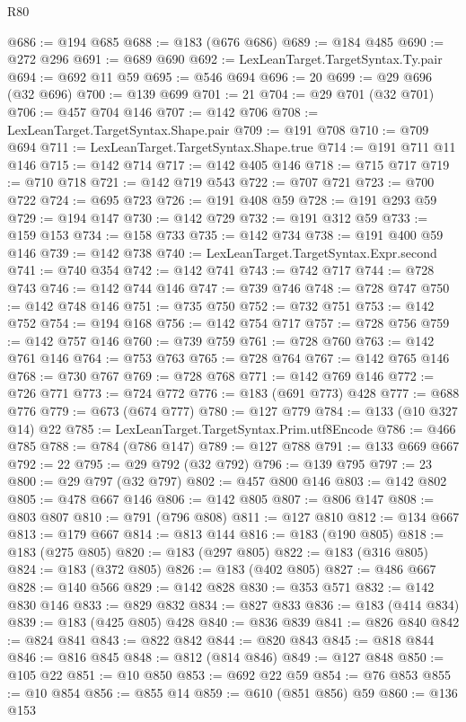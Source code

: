 \begin{lexlean}{R80}
\begin{coremodule}
@686 := @194 @685
@688 := @183 (@676 @686)
@689 := @184 @485
@690 := @272 @296
@691 := @689 @690
@692 := LexLeanTarget.TargetSyntax.Ty.pair
@694 := @692 @11 @59
@695 := @546 @694
@696 := 20
@699 := @29 @696 (@32 @696)
@700 := @139 @699
@701 := 21
@704 := @29 @701 (@32 @701)
@706 := @457 @704 @146
@707 := @142 @706
@708 := LexLeanTarget.TargetSyntax.Shape.pair
@709 := @191 @708
@710 := @709 @694
@711 := LexLeanTarget.TargetSyntax.Shape.true
@714 := @191 @711 @11 @146
@715 := @142 @714
@717 := @142 @405 @146
@718 := @715 @717
@719 := @710 @718
@721 := @142 @719 @543
@722 := @707 @721
@723 := @700 @722
@724 := @695 @723
@726 := @191 @408 @59
@728 := @191 @293 @59
@729 := @194 @147
@730 := @142 @729
@732 := @191 @312 @59
@733 := @159 @153
@734 := @158 @733
@735 := @142 @734
@738 := @191 @400 @59 @146
@739 := @142 @738
@740 := LexLeanTarget.TargetSyntax.Expr.second
@741 := @740 @354
@742 := @142 @741
@743 := @742 @717
@744 := @728 @743
@746 := @142 @744 @146
@747 := @739 @746
@748 := @728 @747
@750 := @142 @748 @146
@751 := @735 @750
@752 := @732 @751
@753 := @142 @752
@754 := @194 @168
@756 := @142 @754 @717
@757 := @728 @756
@759 := @142 @757 @146
@760 := @739 @759
@761 := @728 @760
@763 := @142 @761 @146
@764 := @753 @763
@765 := @728 @764
@767 := @142 @765 @146
@768 := @730 @767
@769 := @728 @768
@771 := @142 @769 @146
@772 := @726 @771
@773 := @724 @772
@776 := @183 (@691 @773) @428
@777 := @688 @776
@779 := @673 (@674 @777)
@780 := @127 @779
@784 := @133 (@10 @327 @14) @22
@785 := LexLeanTarget.TargetSyntax.Prim.utf8Encode
@786 := @466 @785
@788 := @784 (@786 @147)
@789 := @127 @788
@791 := @133 @669 @667
@792 := 22
@795 := @29 @792 (@32 @792)
@796 := @139 @795
@797 := 23
@800 := @29 @797 (@32 @797)
@802 := @457 @800 @146
@803 := @142 @802
@805 := @478 @667 @146
@806 := @142 @805
@807 := @806 @147
@808 := @803 @807
@810 := @791 (@796 @808)
@811 := @127 @810
@812 := @134 @667
@813 := @179 @667
@814 := @813 @144
@816 := @183 (@190 @805)
@818 := @183 (@275 @805)
@820 := @183 (@297 @805)
@822 := @183 (@316 @805)
@824 := @183 (@372 @805)
@826 := @183 (@402 @805)
@827 := @486 @667
@828 := @140 @566
@829 := @142 @828
@830 := @353 @571
@832 := @142 @830 @146
@833 := @829 @832
@834 := @827 @833
@836 := @183 (@414 @834)
@839 := @183 (@425 @805) @428
@840 := @836 @839
@841 := @826 @840
@842 := @824 @841
@843 := @822 @842
@844 := @820 @843
@845 := @818 @844
@846 := @816 @845
@848 := @812 (@814 @846)
@849 := @127 @848
@850 := @105 @22
@851 := @10 @850
@853 := @692 @22 @59
@854 := @76 @853
@855 := @10 @854
@856 := @855 @14
@859 := @610 (@851 @856) @59
@860 := @136 @153

\end{coremodule}
\end{lexlean}
